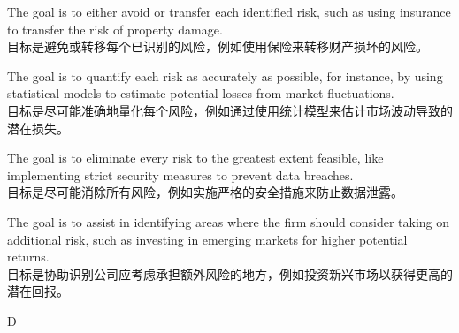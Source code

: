 \documentclass{article}
\begin{document}
\begin{choices}
    \item The goal is to either avoid or transfer each identified risk, such as using insurance to transfer the risk of property damage. \\
    目标是避免或转移每个已识别的风险，例如使用保险来转移财产损坏的风险。
    
    \item The goal is to quantify each risk as accurately as possible, for instance, by using statistical models to estimate potential losses from market fluctuations. \\
    目标是尽可能准确地量化每个风险，例如通过使用统计模型来估计市场波动导致的潜在损失。
    
    \item The goal is to eliminate every risk to the greatest extent feasible, like implementing strict security measures to prevent data breaches. \\
    目标是尽可能消除所有风险，例如实施严格的安全措施来防止数据泄露。
    
    \item The goal is to assist in identifying areas where the firm should consider taking on additional risk, such as investing in emerging markets for higher potential returns. \\
    目标是协助识别公司应考虑承担额外风险的地方，例如投资新兴市场以获得更高的潜在回报。
\end{choices}



\begin{correctanswer}
    D
\end{correctanswer}
\end{document}
